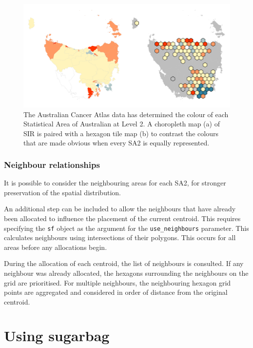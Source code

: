 \documentclass{monashthesis}
\begin{document}
\begin{figure}[H]
\centering
\includegraphics[width=16cm]{figures/03-algorithm/7SIR.png}
\caption{\label{fig:sir}The Australian Cancer Atlas data has determined the colour of each Statistical Area of Australian at Level 2. A choropleth map (a) of SIR is paired with a hexagon tile map (b) to contrast the colours that are made obvious when every SA2 is equally represented.}
\end{figure}

\hypertarget{neighbour-relationships}{%
\subsubsection{Neighbour relationships}\label{neighbour-relationships}}

It is possible to consider the neighbouring areas for each SA2, for stronger preservation of the spatial distribution.

An additional step can be included to allow the neighbours that have already been allocated to influence the placement of the current centroid.
This requires specifying the \texttt{sf} object as the argument for the \texttt{use\_neighbours} parameter. This calculates neighbours using intersections of their polygons. This occurs for all areas before any allocations begin.

During the allocation of each centroid, the list of neighbours is consulted. If any neighbour was already allocated, the hexagons surrounding the neighbours on the grid are prioritised. For multiple neighbours, the neighbouring hexagon grid points are aggregated and considered in order of distance from the original centroid.

\hypertarget{using-sugarbag}{%
\section{Using sugarbag}\label{using-sugarbag}}
\end{document}

